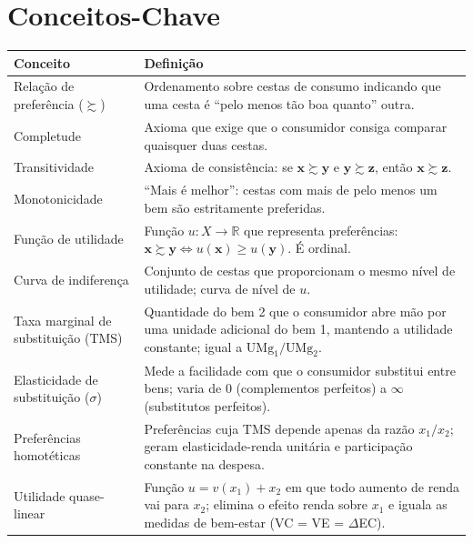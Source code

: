 \documentclass[11pt,twoside,openright]{book}
\begin{document}
\section{Conceitos-Chave}\label{conceitos-chave}

{\def\LTcaptype{none} %
\begin{longtable}[]{@{}
  >{\raggedright\arraybackslash}p{}
  >{\raggedright\arraybackslash}p{}@{}}
\toprule\noalign{}
\begin{minipage}[b]{\linewidth}\raggedright
Conceito
\end{minipage} & \begin{minipage}[b]{\linewidth}\raggedright
Definição
\end{minipage} \\
\midrule\noalign{}
\endhead
\bottomrule\noalign{}
\endlastfoot
Relação de preferência (\(\succsim\)) & Ordenamento sobre cestas de
consumo indicando que uma cesta é ``pelo menos tão boa quanto''
outra. \\
Completude & Axioma que exige que o consumidor consiga comparar
quaisquer duas cestas. \\
Transitividade & Axioma de consistência: se
\(\mathbf{x} \succsim \mathbf{y}\) e \(\mathbf{y} \succsim \mathbf{z}\),
então \(\mathbf{x} \succsim \mathbf{z}\). \\
Monotonicidade & ``Mais é melhor'': cestas com mais de pelo menos um bem
são estritamente preferidas. \\
Função de utilidade & Função \(u: X \to \mathbb{R}\) que representa
preferências:
\(\mathbf{x} \succsim \mathbf{y} \iff u(\mathbf{x}) \geq u(\mathbf{y})\).
É ordinal. \\
Curva de indiferença & Conjunto de cestas que proporcionam o mesmo nível
de utilidade; curva de nível de \(u\). \\
Taxa marginal de substituição (TMS) & Quantidade do bem 2 que o
consumidor abre mão por uma unidade adicional do bem 1, mantendo a
utilidade constante; igual a \(\text{UMg}_1/\text{UMg}_2\). \\
Elasticidade de substituição (\(\sigma\)) & Mede a facilidade com que o
consumidor substitui entre bens; varia de 0 (complementos perfeitos) a
\(\infty\) (substitutos perfeitos). \\
Preferências homotéticas & Preferências cuja TMS depende apenas da razão
\(x_1/x_2\); geram elasticidade-renda unitária e participação constante
na despesa. \\
Utilidade quase-linear & Função \(u = v(x_1) + x_2\) em que todo aumento
de renda vai para \(x_2\); elimina o efeito renda sobre \(x_1\) e iguala
as medidas de bem-estar (VC = VE = \(\Delta\)EC). \\
\end{longtable}
}
\end{document}
